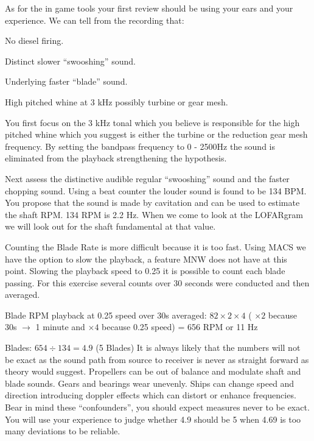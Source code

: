 As for the in game tools your first review should be using your ears and your experience. We can tell from the recording that:

\begin{compactenum}
    \item No diesel firing.
    \item Distinct slower “swooshing” sound.
    \item Underlying faster “blade” sound.
    \item High pitched whine at 3 kHz possibly turbine or gear mesh.
\end{compactenum}


You first focus on the 3 kHz tonal which you believe is responsible for the high pitched whine which you suggest is either the turbine or the reduction gear mesh frequency. By setting the bandpass frequency to 0 - 2500Hz the sound is eliminated from the playback strengthening the hypothesis.

Next assess the distinctive audible regular “swooshing” sound and the faster chopping sound. Using a beat counter the louder sound is found to be 134 BPM. You propose that the sound is made by cavitation and can be used to estimate the shaft RPM. 134 RPM is 2.2 Hz. When we come to look at the LOFARgram we will look out for the shaft fundamental at that value.

Counting the Blade Rate is more difficult because it is too fast. Using MACS we have the option to slow the playback, a feature MNW does not have at this point. Slowing the playback speed to 0.25 it is possible to count each blade passing. For this exercise several counts over 30 seconds were conducted and then averaged.

Blade RPM playback at 0.25 speed over 30s averaged: $82 \times 2 \times 4$ ( $\times 2$ because 30s $\rightarrow$ 1 minute and $\times 4$ because 0.25 speed) = 656 RPM or 11 Hz

Blades: $654 \div 134 = 4.9$ (5 Blades) It is always likely that the numbers will not be exact as the sound path from source to receiver is never as straight forward as theory would suggest. Propellers can be out of balance and modulate shaft and blade sounds. Gears and bearings wear unevenly. Ships can change speed and direction introducing doppler effects which can distort or enhance frequencies. Bear in mind these “confounders”, you should expect measures never to be exact. You will use your experience to judge whether 4.9 should be 5 when 4.69 is too many deviations to be reliable.

